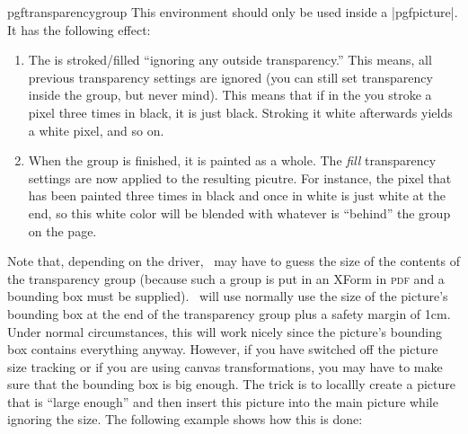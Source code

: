 \begin{environment}{{pgftransparencygroup}}
  This environment should only be used inside a |{pgfpicture}|. It has
  the following effect:
  \begin{enumerate}
  \item The  is stroked/filled
    ``ignoring any outside transparency.'' This means, all previous
    transparency settings are ignored (you can still set transparency
    inside the group, but never mind). This means that if in the
     you stroke a pixel three times in
    black, it is just black. Stroking it white afterwards yields a
    white pixel, and so on.
  \item When the group is finished, it is painted as a whole. The 
    \emph{fill} transparency settings are now applied to the resulting
    picutre. For instance, the pixel that has been painted three times
    in black and once in white is just white at the end, so this white
    color will be blended with whatever is ``behind'' the group on the
    page.
  \end{enumerate}

  Note that, depending on the driver, \pgfname\ may have to guess the
  size of the contents of the transparency group (because such a group
  is put in an XForm in \textsc{pdf} and a bounding box must be
  supplied). \pgfname\ will use normally use the size of the picture's
  bounding box at the end of the transparency group plus a safety
  margin of 1cm. Under normal circumstances, this will work nicely
  since the picture's bounding box contains everything
  anyway. However, if you have switched off the picture size tracking
  or if you are using canvas transformations, you may have to make
  sure that the bounding box is big enough. The trick is to locallly
  create a picture that is ``large enough'' and then insert this
  picture into the main picture while ignoring the size. The following
  example shows how this is done:

  



\end{environment}
